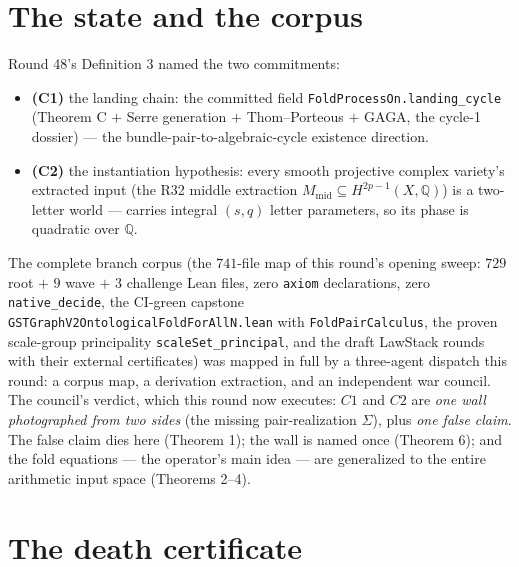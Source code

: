 \documentclass[11pt]{article}
\newcommand{\Q}{\mathbb Q}
\begin{document}
\section{The state and the corpus}

Round 48's Definition 3 named the two commitments:
\begin{itemize}
\item \textbf{(C1)} the landing chain: the committed field
\texttt{FoldProcessOn.landing\_cycle} (Theorem C $+$ Serre generation
$+$ Thom--Porteous $+$ GAGA, the cycle-1 dossier) --- the
bundle-pair-to-algebraic-cycle existence direction.
\item \textbf{(C2)} the instantiation hypothesis: every smooth
projective complex variety's extracted input (the R32 middle
extraction $M_{\mathrm{mid}}\subseteq H^{2p-1}(X,\Q)$) is a
two-letter world --- carries integral $(s,q)$ letter parameters, so its
phase is quadratic over $\Q$.
\end{itemize}
The complete branch corpus (the $741$-file map of this round's opening
sweep: $729$ root $+$ $9$ wave $+$ $3$ challenge Lean files, zero
\texttt{axiom} declarations, zero \texttt{native\_decide}, the CI-green
capstone \texttt{GSTGraphV2OntologicalFoldForAllN.lean} with
\texttt{FoldPairCalculus}, the proven scale-group principality
\texttt{scaleSet\_principal}, and the draft LawStack rounds with their
external certificates) was mapped in full by a three-agent dispatch
this round: a corpus map, a derivation extraction, and an independent
war council. The council's verdict, which this round now executes:
$C1$ and $C2$ are \emph{one wall photographed from two sides} (the
missing pair-realization $\Sigma$), plus \emph{one false claim}. The
false claim dies here (Theorem 1); the wall is named once (Theorem 6);
and the fold equations --- the operator's main idea --- are generalized
to the entire arithmetic input space (Theorems 2--4).

\section{The death certificate}
\end{document}
